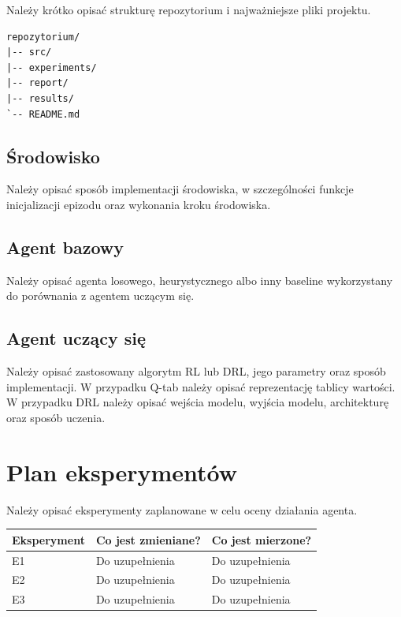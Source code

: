 \documentclass[12pt]{article}
\begin{document}
Należy krótko opisać strukturę repozytorium i najważniejsze pliki projektu.

\begin{verbatim}
repozytorium/
|-- src/
|-- experiments/
|-- report/
|-- results/
`-- README.md
\end{verbatim}

\subsection{Środowisko}

Należy opisać sposób implementacji środowiska, w szczególności funkcje inicjalizacji epizodu oraz wykonania kroku środowiska.

\subsection{Agent bazowy}

Należy opisać agenta losowego, heurystycznego albo inny baseline wykorzystany do porównania z agentem uczącym się.

\subsection{Agent uczący się}

Należy opisać zastosowany algorytm RL lub DRL, jego parametry oraz sposób implementacji. W przypadku Q-tab należy opisać reprezentację tablicy wartości. W przypadku DRL należy opisać wejścia modelu, wyjścia modelu, architekturę oraz sposób uczenia.

\section{Plan eksperymentów}

Należy opisać eksperymenty zaplanowane w celu oceny działania agenta.

\begin{center}
\begin{tabular}{p{}p{}p{}}
\toprule
Eksperyment & Co jest zmieniane? & Co jest mierzone? \\
\midrule
E1 & Do uzupełnienia & Do uzupełnienia \\
E2 & Do uzupełnienia & Do uzupełnienia \\
E3 & Do uzupełnienia & Do uzupełnienia \\
\bottomrule
\end{tabular}
\end{center}
\end{document}
